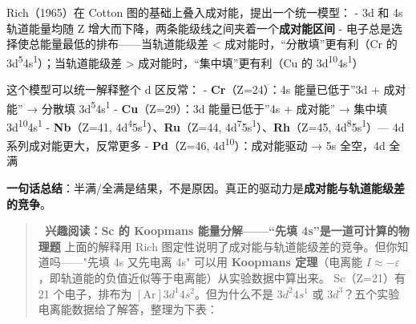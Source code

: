 \documentclass[a4paper,11pt]{ctexart}
\begin{document}
Rich（1965）在 Cotton 图的基础上叠入成对能，提出一个统一模型：
- 3d 和 4s 轨道能量均随 Z 增大而下降，两条能级线之间夹着一个\textbf{成对能区间}
- 电子总是选择使总能量最低的排布------当轨道能级差 \textless{} 成对能时，``分散填''更有利（Cr 的 3d\textsuperscript{5}4s\textsuperscript{1}）；当轨道能级差 \textgreater{} 成对能时，``集中填''更有利（Cu 的 3d\textsuperscript{10}4s\textsuperscript{1}）

这个模型可以统一解释整个 d 区反常：
- \textbf{Cr}（Z=24）：4s 能量已低于''3d + 成对能'' → 分散填 3d\textsuperscript{5}4s\textsuperscript{1}
- \textbf{Cu}（Z=29）：3d 能量已低于''4s + 成对能'' → 集中填 3d\textsuperscript{10}4s\textsuperscript{1}
- \textbf{Nb}（Z=41, 4d\textsuperscript{4}5s\textsuperscript{1}）、\textbf{Ru}（Z=44, 4d\textsuperscript{7}5s\textsuperscript{1}）、\textbf{Rh}（Z=45, 4d\textsuperscript{8}5s\textsuperscript{1}）--- 4d 系列成对能更大，反常更多
- \textbf{Pd}（Z=46, 4d\textsuperscript{10}）：成对能驱动 → 5s 全空，4d 全满

\textbf{一句话总结}：半满/全满是结果，不是原因。真正的驱动力是\textbf{成对能与轨道能级差的竞争}。

\begin{quote}
🧪 \textbf{兴趣阅读：Sc 的 Koopmans 能量分解------``先填 4s''是一道可计算的物理题}
上面的解释用 Rich 图定性说明了成对能与轨道能级差的竞争。但你知道吗------"先填 4s 又先电离 4s" 可以用 \textbf{Koopmans 定理}（电离能 \(I \approx -\varepsilon\)，即轨道能的负值近似等于电离能）从实验数据中算出来。
Sc（Z=21）有 21 个电子，排布为 \([\mathrm{Ar}]3d^1 4s^2\)。但为什么不是 \(3d^2 4s^1\) 或 \(3d^3\)？五个实验电离能数据给了解答，整理为下表：
\end{quote}
\end{document}
